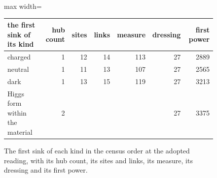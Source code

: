 \begin{figure}[h]\centering
\begin{adjustbox}{max width=\linewidth}\begin{tabular}{lrrrrrr}\toprule
the first sink of its kind & hub count & sites & links & measure & dressing & first power \\ \midrule
charged & 1 & 12 & 14 & 113 & 27 & 2889 \\
neutral & 1 & 11 & 13 & 107 & 27 & 2565 \\
dark & 1 & 13 & 15 & 119 & 27 & 3213 \\
Higgs form within the material & 2 & & & & 27 & 3375 \\ \bottomrule
\end{tabular}\end{adjustbox}
\caption{The first sink of each kind in the census order at the adopted reading, with its hub count, its sites and links, its measure, its dressing and its first power.}
\end{figure}

